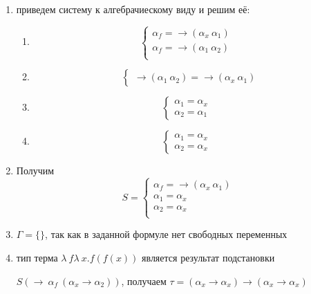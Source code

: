	\begin{enumerate}
		\item приведем систему к алгебрачиескому виду и решим её:\par 
			\begin{enumerate}
			\item \[\begin{cases}
				\alpha_f=\rightarrow(\alpha_x\:\alpha_1)&\\
				\alpha_f=\rightarrow(\alpha_1\:\alpha_2)&\\
			\end{cases}\]
			\item \[
				\begin{cases}
				\rightarrow(\alpha_1\:\alpha_2)=\rightarrow(\alpha_x\:\alpha_1)
				\end{cases}\]
			\item \[
				\begin{cases}
				\alpha_1=\alpha_x&\\
				\alpha_2=\alpha_1
				\end{cases}\]
			\item \[
				\begin{cases}
				\alpha_1=\alpha_x&\\
				\alpha_2=\alpha_x
				\end{cases}\]
\end{enumerate}					
		\item  Получим \[S=\begin{cases}
						\alpha_f=\rightarrow(\alpha_x\:\alpha_1)&\\
						\alpha_1=\alpha_x&\\
						\alpha_2=\alpha_x&\\
				\end{cases}\]
		\item $\Gamma=\{\}$, так как в заданной формуле нет свободных переменных
		\item тип  терма $\lambda\:f\lambda\:x.f(f(x))$ является результат подстановки\par $S(\rightarrow\:\alpha_f\:(\alpha_x\rightarrow\alpha_2))$, получаем $\tau=(\alpha_x\rightarrow\alpha_x)\rightarrow(\alpha_x\rightarrow\alpha_x)$
	\end{enumerate}

